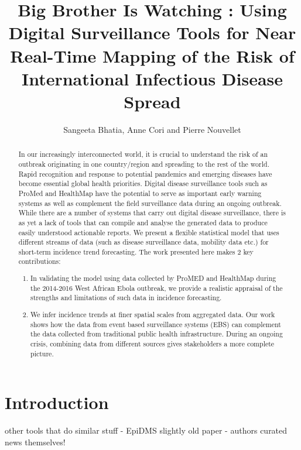 \documentclass[a4paper,12pt]{article}
\begin{document}
\title{Big Brother Is Watching : Using Digital Surveillance Tools for Near Real-Time Mapping of the Risk of International Infectious Disease Spread}
\author{ Sangeeta Bhatia, Anne Cori and Pierre Nouvellet}
\maketitle

\begin{abstract}
  In our increasingly interconnected world, it is crucial to
  understand the risk of an outbreak originating in one country/region
  and  spreading to the rest of the world. Rapid recognition and
  response to potential pandemics and emerging diseases have become
  essential global health priorities. Digital disease surveillance
  tools such as ProMed and HealthMap have the potential to serve as
  important early warning systems as well as complement the field
  surveillance data during an ongoing outbreak. While there are a
  number of systems that carry out digital disease surveillance, there
  is as yet a lack of tools that can compile and analyse the generated
  data to produce easily understood actionable reports. We present a flexible statistical model that uses different streams
  of data (such as disease surveillance data, mobility data etc.) for
  short-term incidence trend forecasting.
  The work presented here makes 2 key contributions:
  \begin{enumerate}
  \item In validating the model using data collected by ProMED and
    HealthMap during the 2014-2016 West African Ebola outbreak,
    we provide a realistic appraisal of the strengths and limitations
    of such data in incidence forecasting.
    \item We infer incidence trends at finer spatial scales from
      aggregated data. Our work shows how the data from
      event based surveillance systems (EBS) can complement the data
      collected from traditional
      public health infrastructure. During an
      ongoing crisis, combining data from different sources gives
      stakeholders a more complete picture.
  \end{enumerate}
\end{abstract}
\section{Introduction}
other tools that do similar stuff - EpiDMS \citep{liu2016epidms}
slightly old paper - authors curated news themselves! \citep{chowell2016elucidating} 
\end{document}
